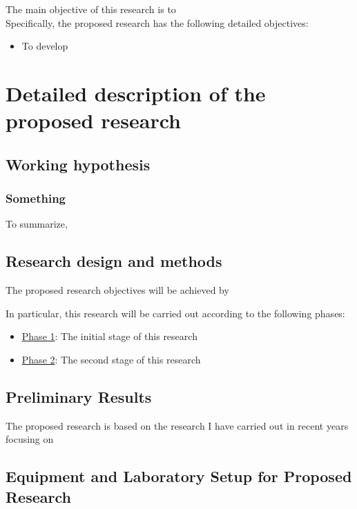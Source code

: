 \documentclass[a4paper,11pt]{article}
\begin{document}
The main objective of this research is to
\\

\noindent Specifically, the proposed research has the following detailed objectives:
\begin{itemize}
    \item To develop 
\end{itemize}

\section{Detailed description of the proposed research}

\subsection{Working hypothesis}
\label{sec:hypothesis}

\subsubsection{Something }

To summarize, 

\subsection{Research design and methods}
\label{sec:methods}

The proposed research objectives will be achieved by

In particular, this research will be carried out according to the following phases:
\begin{itemize}
    \item \underline{Phase 1}: The initial stage of this research
    \item \underline{Phase 2}: The second stage of this research
\end{itemize}

\subsection{Preliminary Results}
\label{sec:preliminary_results}

The proposed research is based on the research I have carried out in recent years focusing on 


\subsection{Equipment and Laboratory Setup for Proposed Research}
\label{sec:equipment}


\newpage
\singlespacing

\end{document}
